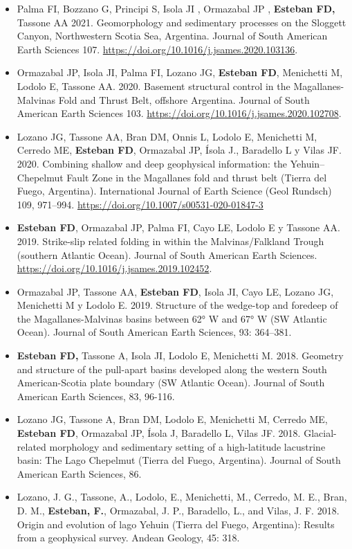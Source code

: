 \documentclass[11pt, a4paper]{article}
\begin{document}
\begin{itemize}
    \item Palma FI, Bozzano G, Principi S, Isola JI , Ormazabal JP , \textbf{Esteban FD,} Tassone AA 2021. Geomorphology and sedimentary processes on the Sloggett Canyon, Northwestern Scotia Sea, Argentina. Journal of South American Earth Sciences 107. \url{https://doi.org/10.1016/j.jsames.2020.103136}.
    \item Ormazabal JP, Isola JI, Palma FI, Lozano JG, \textbf{Esteban FD}, Menichetti M, Lodolo E, Tassone AA. 2020. Basement structural control in the Magallanes-Malvinas Fold and Thrust Belt, offshore Argentina. Journal of South American Earth Sciences 103. \url{https://doi.org/10.1016/j.jsames.2020.102708}.
    \item Lozano JG, Tassone AA, Bran DM, Onnis L, Lodolo E, Menichetti M, Cerredo ME, \textbf{Esteban FD}, Ormazabal JP, Ísola J., Baradello L y Vilas JF. 2020. Combining shallow and deep geophysical information: the Yehuin–Chepelmut Fault Zone in the Magallanes fold and thrust belt (Tierra del Fuego, Argentina). International Journal of Earth Science (Geol Rundsch) 109, 971–994. \url{https://doi.org/10.1007/s00531-020-01847-3}
    \item \textbf{Esteban FD}, Ormazabal JP, Palma FI, Cayo LE, Lodolo E y Tassone AA. 2019. Strike-slip related folding in within the Malvinas/Falkland Trough (southern Atlantic Ocean). Journal of South American Earth Sciences. \url{https://doi.org/10.1016/j.jsames.2019.102452}.
    \item Ormazabal JP, Tassone AA, \textbf{Esteban FD}, Isola JI, Cayo LE, Lozano JG, Menichetti M y Lodolo E. 2019. Structure of the wedge-top and foredeep of the Magallanes-Malvinas basins between 62° W and 67° W (SW Atlantic Ocean). Journal of South American Earth Sciences, 93: 364–381.
    \item \textbf{Esteban FD,} Tassone A, Isola JI, Lodolo E, Menichetti M. 2018. Geometry and structure of the pull-apart basins developed along the western South American-Scotia plate boundary (SW Atlantic Ocean). Journal of South American Earth Sciences, 83, 96-116.
    \item Lozano JG, Tassone A, Bran DM, Lodolo E, Menichetti M, Cerredo ME, \textbf{Esteban FD}, Ormazabal JP, Ísola J, Baradello L, Vilas JF. 2018. Glacial-related morphology and sedimentary setting of a high-latitude lacustrine basin: The Lago Chepelmut (Tierra del Fuego, Argentina). Journal of South American Earth Sciences, 86.
    \item Lozano, J. G., Tassone, A., Lodolo, E., Menichetti, M., Cerredo, M. E., Bran, D. M., \textbf{Esteban, F.}, Ormazabal, J. P., Baradello, L., and Vilas, J. F. 2018. Origin and evolution of lago Yehuin (Tierra del Fuego, Argentina): Results from a geophysical survey. Andean Geology, 45: 318.

\end{itemize}
\end{document}
